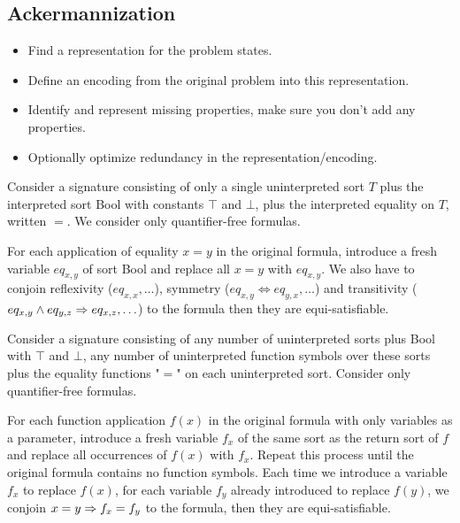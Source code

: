 \subsection{Ackermannization}
\begin{mytitle} \hfill
\begin{itemize}
    \item Find a representation for the problem states.
    \item Define an encoding from the original problem into this representation.
    \item Identify and represent missing properties, make sure you don't add any properties.
    \item Optionally optimize redundancy in the representation/encoding.
\end{itemize}
\end{mytitle}
\begin{mytitle}[Equality] 
    \begin{mysubtitle}  Consider a signature consisting of only a single uninterpreted sort $T$ plus the interpreted sort Bool with constants $\top$ and $\bot$, plus the interpreted equality on $T$, written $=$. We consider only quantifier-free formulas. 
    \end{mysubtitle}
    \begin{mysubtitle}[Ackermannization] For each application of equality $x=y$ in the original formula, introduce a fresh variable $eq_{x,y}$ of sort Bool and replace all $x=y$ with $eq_{x,y}$. We also have to conjoin reflexivity ($eq_{x,x}, \ldots$), symmetry ($eq_{x,y} \Leftrightarrow eq_{y,x}, \ldots$) and transitivity ($eq_{x,y} \land eq_{y,z} \Rightarrow eq_{x,z}, \ldots$) to the formula then they are equi-satisfiable.
    \end{mysubtitle}
\end{mytitle}
\begin{mytitle} 
    \begin{mysubtitle}  Consider a signature consisting of any number of uninterpreted sorts plus Bool with $\top$ and $\bot$, any number of uninterpreted function symbols over these sorts plus the equality functions "$=$" on each uninterpreted sort. Consider only quantifier-free formulas.
    \end{mysubtitle}
    \begin{mysubtitle}[Ackermannization] For each function application $f(x)$ in the original formula with only variables as a parameter, introduce a fresh variable $f_x$ of the same sort as the return sort of $f$ and replace all occurrences of $f(x)$ with $f_x$. Repeat this process until the original formula contains no function symbols. Each time we introduce a variable $f_x$ to replace $f(x)$, for each variable $f_y$ already introduced to replace $f(y)$, we conjoin $x=y \Rightarrow f_x = f_y$ to the formula, then they are equi-satisfiable.
    \end{mysubtitle}
\end{mytitle}
